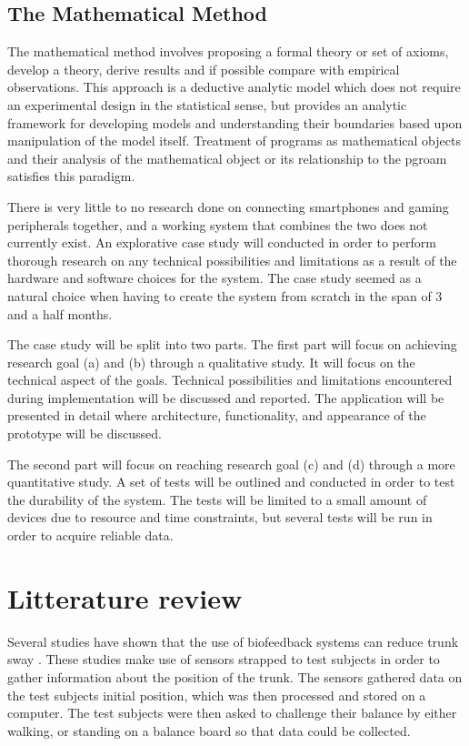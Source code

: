 \subsection{The Mathematical Method}
The mathematical method involves proposing a formal theory or set of axioms, develop a theory, derive results and if possible compare with empirical observations. This approach is a deductive analytic model which does not require an experimental design in the statistical sense, but provides an analytic framework for developing models and understanding their boundaries based upon manipulation of the model itself. Treatment of programs as mathematical objects and their analysis of the mathematical object or its relationship to the pgroam satisfies this paradigm.



There is very little to no research done on connecting smartphones and gaming peripherals together, and a working system that combines the two does not currently exist. An explorative case study will conducted in order to perform thorough research on any technical possibilities and limitations as a result of the hardware and software choices for the system. The case study seemed as a natural choice when having to create the system from scratch in the span of 3 and a half months.

The case study will be split into two parts. The first part will focus on achieving research goal (a) and (b) through a qualitative study. It will focus on the technical aspect of the goals. Technical possibilities and limitations encountered during implementation will be discussed and reported. The application will be presented in detail where architecture, functionality, and appearance of the prototype will be discussed.

The second part will focus on reaching research goal (c) and (d) through a more quantitative study. A set of tests will be outlined and conducted in order to test the durability of the system. The tests will be limited to a small amount of devices due to resource and time constraints, but several tests will be run in order to acquire reliable data.

\section{Litterature review}
Several studies have shown that the use of biofeedback systems can reduce trunk sway \cite{multiModualBiofeedback, vibrotactileBiofeedback, vibrotactileTiltFeedback}. These studies make use of sensors strapped to test subjects in order to gather information about the position of the trunk. The sensors gathered data on the test subjects initial position, which was then processed and stored on a computer. The test subjects were then asked to challenge their balance by either walking, or standing on a balance board so that data could be collected.

